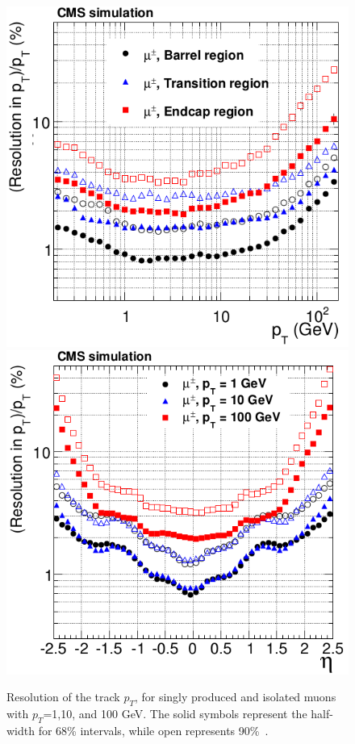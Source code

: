 \begin{figure}[!Hh]
       \centering
       \includegraphics[scale=0.5]{Figures/TrackRes_pt.png} 
       \includegraphics[scale=0.5]{Figures/TrackRes_eta.png} \\
       \caption[Transverse momentum resolution of tracks.]{Resolution of the track $p_T$, for singly produced and isolated muons with $p_T$=1,10, and 100 GeV.  The solid symbols represent the half-width for 68\% intervals, while open represents 90\%~\cite{TrackReco}.}
\label{figapp:TrackRes}
\end{figure}



